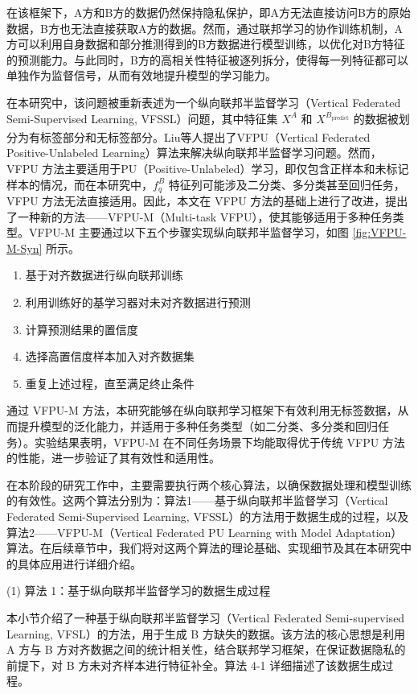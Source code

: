 在该框架下，A方和B方的数据仍然保持隐私保护，即A方无法直接访问B方的原始数据，B方也无法直接获取A方的数据。然而，通过联邦学习的协作训练机制，A方可以利用自身数据和部分推测得到的B方数据进行模型训练，以优化对B方特征的预测能力。与此同时，B方的高相关性特征被逐列拆分，使得每一列特征都可以单独作为监督信号，从而有效地提升模型的学习能力。

在本研究中，该问题被重新表述为一个纵向联邦半监督学习（Vertical Federated Semi-Supervised Learning, VFSSL）问题，其中特征集 $X^A$ 和 $X^{B_{\text{predict}}}$ 的数据被划分为有标签部分和无标签部分。Liu等人\textsuperscript{\cite{liu2023multi}}提出了VFPU（Vertical Federated Positive-Unlabeled Learning）算法来解决纵向联邦半监督学习问题。然而，VFPU 方法主要适用于PU（Positive-Unlabeled）学习，即仅包含正样本和未标记样本的情况，而在本研究中，$ f_q^B $ 特征列可能涉及二分类、多分类甚至回归任务，VFPU 方法无法直接适用。因此，本文在 VFPU 方法的基础上进行了改进，提出了一种新的方法——VFPU-M（Multi-task VFPU），使其能够适用于多种任务类型。VFPU-M 主要通过以下五个步骤实现纵向联邦半监督学习，如图 \ref{fig:VFPU-M-Syn} 所示。
\begin{enumerate}
	\item 基于对齐数据进行纵向联邦训练  
	\item 利用训练好的基学习器对未对齐数据进行预测  
	\item 计算预测结果的置信度  
	\item 选择高置信度样本加入对齐数据集  
	\item 重复上述过程，直至满足终止条件  
\end{enumerate}
通过 VFPU-M 方法，本研究能够在纵向联邦学习框架下有效利用无标签数据，从而提升模型的泛化能力，并适用于多种任务类型（如二分类、多分类和回归任务）。实验结果表明，VFPU-M 在不同任务场景下均能取得优于传统 VFPU 方法的性能，进一步验证了其有效性和适用性。

在本阶段的研究工作中，主要需要执行两个核心算法，以确保数据处理和模型训练的有效性。这两个算法分别为：算法1——基于纵向联邦半监督学习（Vertical Federated Semi-Supervised Learning, VFSSL）的方法用于数据生成的过程，以及算法2——VFPU-M（Vertical Federated PU Learning with Model Adaptation）算法。在后续章节中，我们将对这两个算法的理论基础、实现细节及其在本研究中的具体应用进行详细介绍。

(1) 算法 1：基于纵向联邦半监督学习的数据生成过程

本小节介绍了一种基于纵向联邦半监督学习（Vertical Federated Semi-supervised Learning, VFSL）的方法，用于生成 B 方缺失的数据。该方法的核心思想是利用 A 方与 B 方对齐数据之间的统计相关性，结合联邦学习框架，在保证数据隐私的前提下，对 B 方未对齐样本进行特征补全。算法 4-1 详细描述了该数据生成过程。

